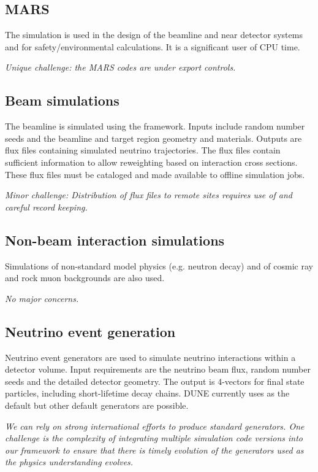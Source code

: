 \documentclass[../main-v1.tex]{subfiles}
\begin{document}
\subsection{MARS}
The \cite{abs1} simulation is used in the design of the beamline and near detector systems and  for safety/environmental calculations.  It is a significant user of CPU time. 

{\it Unique challenge: the MARS codes are under export controls.}

\subsection{Beam simulations}
The  beamline is simulated using the  framework.  Inputs include random number seeds and the beamline and target region geometry and materials.  Outputs are flux files containing simulated neutrino trajectories.  The flux files contain sufficient information to allow reweighting based on interaction cross sections.  These flux files must be cataloged and made available to offline simulation jobs.

{\it Minor challenge:  Distribution of flux files to remote sites requires use of  and careful record keeping.}

\subsection{Non-beam interaction simulations}
Simulations of non-standard model physics (e.g. neutron decay) and of cosmic ray and rock muon backgrounds are also used. 

{\it No major concerns.}

\subsection{Neutrino event generation}
Neutrino event generators are used to simulate neutrino interactions within a detector volume.  Input requirements are the neutrino beam flux, random number seeds and the detailed detector geometry. The output is 4-vectors for final state particles, including short-lifetime decay chains.  DUNE currently uses \cite{GENIE} as the default but other default generators are possible. 

{\it We can rely on strong international efforts to produce standard generators. One challenge is the complexity of integrating multiple simulation code versions into our framework to ensure that there is timely evolution of the generators used as the physics understanding evolves.}
\end{document}
